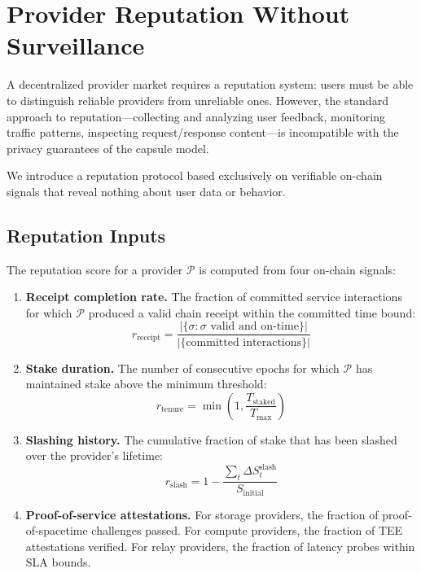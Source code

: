 \documentclass[11pt,a4paper]{article}
\begin{document}
\section{Provider Reputation Without Surveillance}\label{sec:reputation}

A decentralized provider market requires a reputation system: users must be
able to distinguish reliable providers from unreliable ones. However, the
standard approach to reputation---collecting and analyzing user feedback,
monitoring traffic patterns, inspecting request/response content---is
incompatible with the privacy guarantees of the capsule model.

We introduce a reputation protocol based exclusively on verifiable on-chain
signals that reveal nothing about user data or behavior.

\subsection{Reputation Inputs}

The reputation score for a provider $\mathcal{P}$ is computed from four
on-chain signals:

\begin{enumerate}
    \item \textbf{Receipt completion rate.} The fraction of committed service
    interactions for which $\mathcal{P}$ produced a valid chain receipt within
    the committed time bound:
    \begin{equation}
        r_{\text{receipt}} = \frac{|\{\sigma : \sigma \text{ valid and on-time}\}|}{|\{\text{committed interactions}\}|}
    \end{equation}

    \item \textbf{Stake duration.} The number of consecutive epochs for which
    $\mathcal{P}$ has maintained stake above the minimum threshold:
    \begin{equation}
        r_{\text{tenure}} = \min\left(1, \frac{T_{\text{staked}}}{T_{\text{max}}}\right)
    \end{equation}

    \item \textbf{Slashing history.} The cumulative fraction of stake that has
    been slashed over the provider's lifetime:
    \begin{equation}
        r_{\text{slash}} = 1 - \frac{\sum_{t} \Delta S_t^{\text{slash}}}{S_{\text{initial}}}
    \end{equation}

    \item \textbf{Proof-of-service attestations.} For storage providers, the
    fraction of proof-of-spacetime challenges passed. For compute providers,
    the fraction of TEE attestations verified. For relay providers, the
    fraction of latency probes within SLA bounds.
\end{enumerate}
\end{document}
